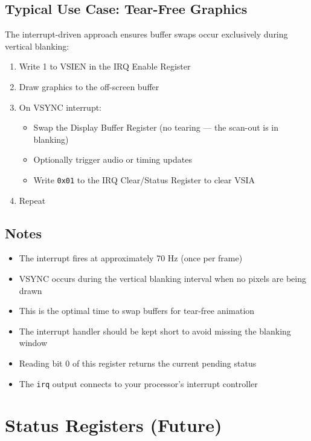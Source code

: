 \documentclass[11pt,letterpaper]{report}
\begin{document}
\subsection{Typical Use Case: Tear-Free Graphics}

The interrupt-driven approach ensures buffer swaps occur exclusively during vertical blanking:

\begin{enumerate}
    \item Write 1 to VSIEN in the IRQ Enable Register
    \item Draw graphics to the off-screen buffer
    \item On VSYNC interrupt:
    \begin{itemize}
        \item Swap the Display Buffer Register (no tearing --- the scan-out is in blanking)
        \item Optionally trigger audio or timing updates
        \item Write \texttt{0x01} to the IRQ Clear/Status Register to clear VSIA
    \end{itemize}
    \item Repeat
\end{enumerate}

\subsection{Notes}

\begin{itemize}
    \item The interrupt fires at approximately 70 Hz (once per frame)
    \item VSYNC occurs during the vertical blanking interval when no pixels are being drawn
    \item This is the optimal time to swap buffers for tear-free animation
    \item The interrupt handler should be kept short to avoid missing the blanking window
    \item Reading bit 0 of this register returns the current pending status
    \item The \texttt{irq} output connects to your processor's interrupt controller
\end{itemize}

\section{Status Registers (Future)}
\end{document}
